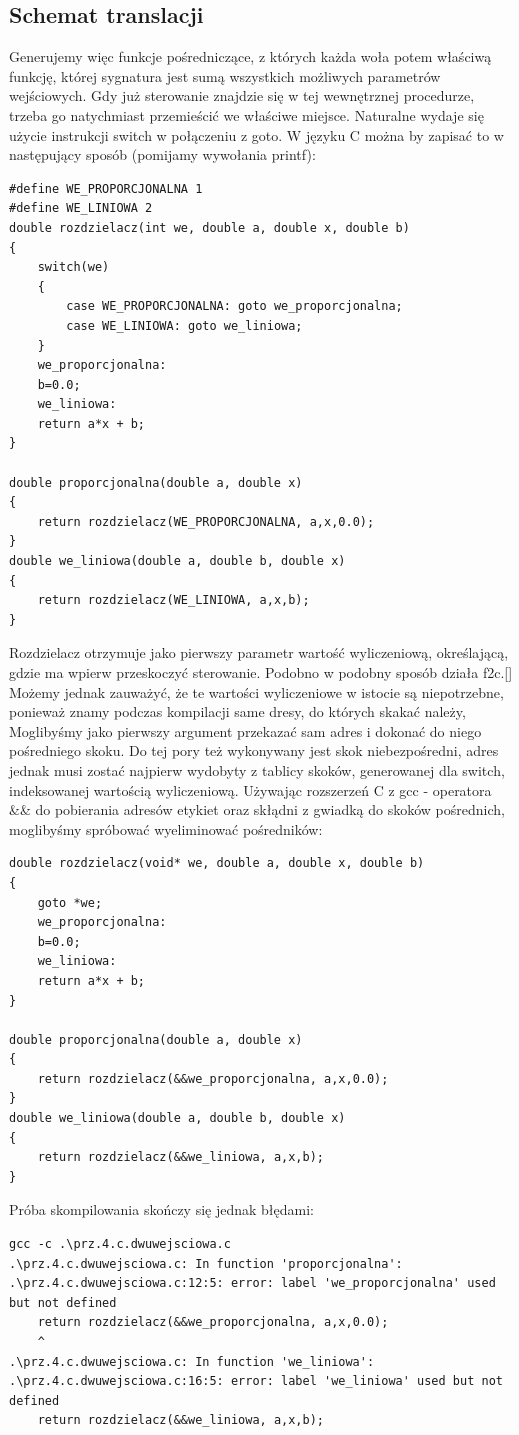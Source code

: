 \subsection{Schemat translacji}
Generujemy więc funkcje pośredniczące, z których każda woła potem właściwą funkcję, której sygnatura jest sumą wszystkich możliwych parametrów wejściowych. Gdy już sterowanie znajdzie się w tej wewnętrznej procedurze, trzeba go natychmiast przemieścić we właściwe miejsce. Naturalne wydaje się użycie instrukcji switch w połączeniu z goto. W języku C można by zapisać to w następujący sposób (pomijamy wywołania printf):
\begin{lstlisting}
#define WE_PROPORCJONALNA 1
#define WE_LINIOWA 2
double rozdzielacz(int we, double a, double x, double b)
{
	switch(we)
	{
    	case WE_PROPORCJONALNA: goto we_proporcjonalna;
    	case WE_LINIOWA: goto we_liniowa;
	}
	we_proporcjonalna:
	b=0.0;
	we_liniowa:
	return a*x + b;
}

double proporcjonalna(double a, double x)
{
	return rozdzielacz(WE_PROPORCJONALNA, a,x,0.0);
}
double we_liniowa(double a, double b, double x)
{
	return rozdzielacz(WE_LINIOWA, a,x,b);
}
\end{lstlisting}
Rozdzielacz otrzymuje jako pierwszy parametr wartość wyliczeniową, określającą, gdzie ma wpierw przeskoczyć sterowanie.
Podobno w podobny sposób działa f2c.[] Możemy jednak zauważyć, że te wartości wyliczeniowe w istocie są niepotrzebne, ponieważ znamy podczas kompilacji same dresy, do których skakać należy, Moglibyśmy jako pierwszy argument przekazać sam adres i dokonać do niego pośredniego skoku. Do tej pory też wykonywany jest skok niebezpośredni, adres jednak musi zostać najpierw wydobyty z tablicy skoków, generowanej dla switch, indeksowanej wartością wyliczeniową. Używając rozszerzeń C z gcc - operatora \&\& do pobierania adresów etykiet oraz skłądni z gwiadką do skoków pośrednich, moglibyśmy spróbować wyeliminować pośredników:
\begin{lstlisting}
double rozdzielacz(void* we, double a, double x, double b)
{
	goto *we;
	we_proporcjonalna:
	b=0.0;
	we_liniowa:
	return a*x + b;
}

double proporcjonalna(double a, double x)
{
	return rozdzielacz(&&we_proporcjonalna, a,x,0.0);
}
double we_liniowa(double a, double b, double x)
{
	return rozdzielacz(&&we_liniowa, a,x,b);
}
\end{lstlisting}
Próba skompilowania skończy się jednak błędami:
\begin{lstlisting}
gcc -c .\prz.4.c.dwuwejsciowa.c
.\prz.4.c.dwuwejsciowa.c: In function 'proporcjonalna':
.\prz.4.c.dwuwejsciowa.c:12:5: error: label 'we_proporcjonalna' used but not defined
 	return rozdzielacz(&&we_proporcjonalna, a,x,0.0);
 	^
.\prz.4.c.dwuwejsciowa.c: In function 'we_liniowa':
.\prz.4.c.dwuwejsciowa.c:16:5: error: label 'we_liniowa' used but not defined
 	return rozdzielacz(&&we_liniowa, a,x,b);
\end{lstlisting}
